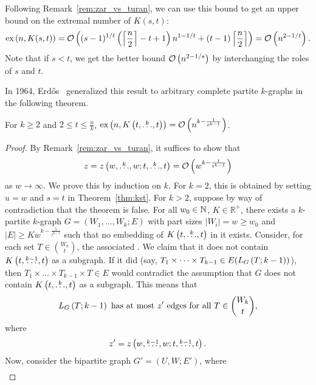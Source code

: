 \begin{remark}
    Following Remark~\ref{rem:zar_vs_turan}, we can use this bound to get an upper bound on the extremal number of $K(s, t)$:
    \[
        \text{ex} \left( n, K(s, t) \right) =
        \mathcal{O}\left((s - 1)^{1 / t}\left(\left\lceil\frac{n}{2}\right\rceil - t + 1\right)n^{1 - 1 / t} + (t - 1)\left\lceil\frac{n}{2}\right\rceil\right) =
        \mathcal{O}\left(n^{2 - 1 / t}\right).
    \]
    Note that if $s < t$, we get the better bound $\mathcal{O}\left(n^{2 - 1 / s}\right)$ by interchanging the roles of $s$ and $t$.
\end{remark}

In 1964, Erdős~\cite{Erods1964} generalized this result to arbitrary complete partite $k$-graphs in the following theorem.

\begin{theorem}\label{thm:erdos64}
    For $k \geq 2$ and $2 \leq t \leq \frac{n}{k}$,
    $\text{ex} \left( n, K\left(t, \overset{k}{\dots}, t\right) \right) = \mathcal{O}\left(n^{k - \frac{1}{t^{k-1}}}\right)$.
    \begin{proof}
        By Remark~\ref{rem:zar_vs_turan}, it suffices to show that
        \[
            z = z\left(w, \overset{k}{\dots}, w; t, \overset{k}{\dots}, t\right) = \mathcal{O}\left(w^{k - \frac{1}{t^{k-1}}}\right)
        \]
        as $w \to \infty$.
        We prove this by induction on $k$.
        For $k=2$, this is obtained by setting $u = w$ and $s = t$ in Theorem~\ref{thm:kst}.
        For $k > 2$, suppose by way of contradiction that the theorem is false.
        For all ${w_0 \in \mathbb{N}}$, ${K \in \mathbb{R}^+}$, there exists a $k$-partite $k$-graph $G = (W_1, \dots, W_k; E)$ with part sizes
        $|W_i| = w \geq w_0$ and ${|E| \geq K w^{k - \frac{1}{t^{k-1}}}}$ such that no embedding of $K\left(t, \overset{k}{\dots}, t\right)$ in it exists.
        Consider, for each set $T \in \binom{W_k}{t}$, the associated 
        .
        We claim that it does not contain $K\left(t, \overset{k-1}{\dots}, t\right)$ as a subgraph.
        If it did (say, $T_1 \times \dots \times T_{k-1} \in E(L_{G}\left(T; k-1\right))$),
        then $T_1 \times \dots \times T_{k-1} \times T \in E$
        would contradict the assumption that $G$ does not contain $K\left(t, \overset{k}{\dots}, t\right)$ as a subgraph.
        This means that
        \begin{equation} \label{eq:conditionlink}
            L_{G}\left(T; k-1\right) \text{ has at most $z'$ edges for all } T \in \binom{W_k}{t},
        \end{equation}
        where
        \[
            z' = z\left(w, \overset{k-1}{\dots}, w; t, \overset{k-1}{\dots}, t\right).
        \]
        Now, consider the bipartite graph $G' = (U, W; E')$, where
        \begin{align*}

\end{align*}
\end{proof}
\end{theorem}
